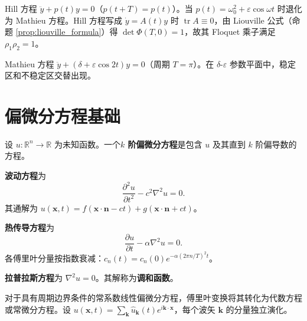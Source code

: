 \begin{example}\label{ex:hill_equation}
Hill 方程 $\ddot{y} + p(t) y = 0$（$p(t+T) = p(t)$）。当 $p(t) = \omega_0^2 + \varepsilon \cos \omega t$ 时退化为 Mathieu 方程。Hill 方程写成 $\dot y=A(t)y$ 时 $\operatorname{tr}A\equiv0$，由 Liouville 公式（命题 \ref{prop:liouville_formula}）得 $\det\Phi(T,0)=1$，故其 Floquet 乘子满足 $\rho_1 \rho_2 = 1$。
\end{example}

\begin{example}\label{ex:mathieu}
Mathieu 方程 $\ddot{y} + (\delta + \varepsilon \cos 2t) y = 0$（周期 $T = \pi$）。在 $\delta$-$\varepsilon$ 参数平面中，稳定区和不稳定区交替出现。
\end{example}

\section{偏微分方程基础}\label{sec:pde_basic}

\begin{definition}[偏微分方程]\label{def:pde}
设 $u: \mathbb{R}^n \to \mathbb{R}$ 为未知函数。一个\textbf{$k$ 阶偏微分方程}是包含 $u$ 及其直到 $k$ 阶偏导数的方程。
\end{definition}

\begin{definition}[波动方程]\label{def:wave_equation}
\textbf{波动方程}为
\[
\frac{\partial^2 u}{\partial t^2} - c^2 \nabla^2 u = 0.
\]
其通解为 $u(\mathbf{x}, t) = f(\mathbf{x} \cdot \mathbf{n} - ct) + g(\mathbf{x} \cdot \mathbf{n} + ct)$。
\end{definition}

\begin{definition}[热传导方程]\label{def:heat_equation}
\textbf{热传导方程}为
\[
\frac{\partial u}{\partial t} - \alpha \nabla^2 u = 0.
\]
各傅里叶分量按指数衰减：$c_n(t) = c_n(0) e^{-\alpha (2\pi n/T)^2 t}$。
\end{definition}

\begin{definition}[拉普拉斯方程]\label{def:laplace_equation}
\textbf{拉普拉斯方程}为 $\nabla^2 u = 0$。其解称为\textbf{调和函数}。
\end{definition}

\begin{proposition}[常系数线性偏微分方程的傅里叶解法]\label{prop:pde_fourier_solution}
对于具有周期边界条件的常系数线性偏微分方程，傅里叶变换将其转化为代数方程或常微分方程。设 $u(\mathbf{x}, t) = \sum_{\mathbf{k}} \hat{u}_{\mathbf{k}}(t) e^{i \mathbf{k} \cdot \mathbf{x}}$，每个波矢 $\mathbf{k}$ 的分量独立演化。
\end{proposition}

